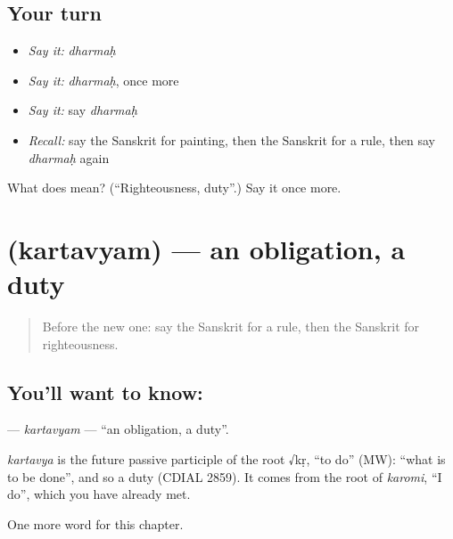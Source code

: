 \subsection*{Your turn}
\begin{itemize}
\raggedright
  \item \emph{Say it:} \emph{dharmaḥ}
  \item \emph{Say it:} \emph{dharmaḥ}, once more
  \item \emph{Say it:} say \emph{dharmaḥ}
  \item \emph{Recall:} say the Sanskrit for painting, then the Sanskrit for a rule, then say \emph{dharmaḥ} again
\end{itemize}

\begin{tcolorbox}[breakable,colback=teal!4,colframe=teal!35!black,title={Before you move on}]
What does  mean? (\textquotedblleft{}Righteousness, duty\textquotedblright{}.) Say it once more.
\end{tcolorbox}
\section[\texorpdfstring{\sk{कर्तव्यम्} (kartavyam)}{कर्तव्यम् (kartavyam)}]{ (kartavyam) — an obligation, a duty}

\label{lesson:SA-C229-kartavyam}



\begin{quote}
Before the new one: say the Sanskrit for a rule, then the Sanskrit for righteousness.
\end{quote}

\subsection*{You'll want to know: }
\textbf{} — \emph{kartavyam} — \textquotedblleft{}an obligation, a duty\textquotedblright{}.

\begin{cousinweb}
\emph{kartavya} is the future passive participle of the root √kṛ, \textquotedblleft{}to do\textquotedblright{} (MW): \textquotedblleft{}what is to be done\textquotedblright{}, and so a duty (CDIAL 2859). It comes from the root of \emph{karomi}, \textquotedblleft{}I do\textquotedblright{}, which you have already met.
\end{cousinweb}

\begin{grammarlens}[title={What you've built}]
One more word for this chapter.
\end{grammarlens}

